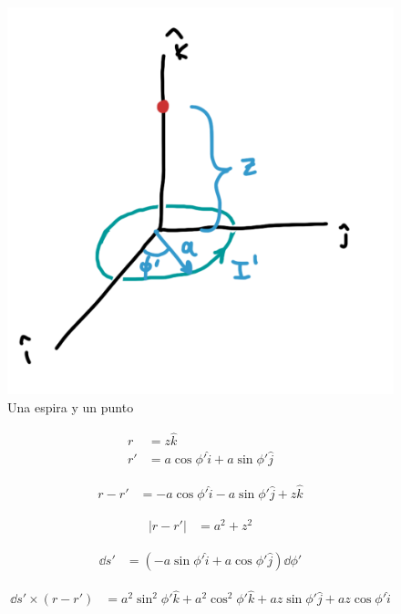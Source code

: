 \documentclass[11pt]{report}
\theoremstyle{plain}
\theoremstyle{definition}
\begin{document}
\begin{figure}[!h] %
	\centering
	\includegraphics[scale=0.15]{induccionMag_ej2.png}
	\caption{Una espira y un punto}
	\label{fig:Tarea2}
\end{figure}

\begin{align*} %
	r &= z\hat{k}\\
	r' &= a\cos{\phi'}\hat{i} + a\sin{\phi'}\hat{j}
\end{align*}

\begin{align*} %
	r- r'&= - a\cos{\phi'}\hat{i} - a\sin{\phi'}\hat{j} + z\hat{k}
\end{align*}

\begin{align*} %
	|r- r'| &=  a^2 + z^2
\end{align*}

\begin{align*} %
	\dd{s'} &= (-a\sin{\phi'}\hat{i} + a\cos{\phi'}\hat{j})\dd{\phi'} 
\end{align*}

\begin{align*} %
	\dd{s'} \times (r- r') &= a^2\sin^2{\phi'}\hat{k} + a^2\cos^2{\phi'}\hat{k} + az\sin{\phi'}\hat{j} + az\cos{\phi'}\hat{i}
\end{align*}
\end{document}
